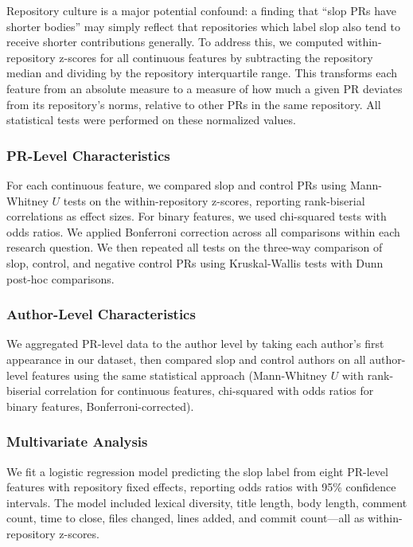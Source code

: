 \documentclass[11pt]{article}
\begin{document}
	Repository culture is a major potential confound: a finding that ``slop PRs have shorter bodies'' may simply reflect that repositories which label slop also tend to receive shorter contributions generally. To address this, we computed within-repository z-scores for all continuous features by subtracting the repository median and dividing by the repository interquartile range. This transforms each feature from an absolute measure to a measure of how much a given PR deviates from its repository's norms, relative to other PRs in the same repository. All statistical tests were performed on these normalized values.
	
	\subsubsection{PR-Level Characteristics}
	
	For each continuous feature, we compared slop and control PRs using Mann-Whitney $U$ tests on the within-repository z-scores, reporting rank-biserial correlations as effect sizes. For binary features, we used chi-squared tests with odds ratios. We applied Bonferroni correction across all comparisons within each research question. We then repeated all tests on the three-way comparison of slop, control, and negative control PRs using Kruskal-Wallis tests with Dunn post-hoc comparisons.
	
	\subsubsection{Author-Level Characteristics}
	
	We aggregated PR-level data to the author level by taking each author's first appearance in our dataset, then compared slop and control authors on all author-level features using the same statistical approach (Mann-Whitney $U$ with rank-biserial correlation for continuous features, chi-squared with odds ratios for binary features, Bonferroni-corrected).
	
	\subsubsection{Multivariate Analysis}
	
	We fit a logistic regression model predicting the slop label from eight PR-level features with repository fixed effects, reporting odds ratios with 95\% confidence intervals. The model included lexical diversity, title length, body length, comment count, time to close, files changed, lines added, and commit count---all as within-repository z-scores.
	
\end{document}
